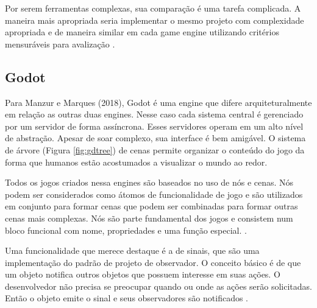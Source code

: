 Por serem ferramentas complexas, sua comparação é uma tarefa complicada. A maneira mais apropriada seria implementar o mesmo projeto com complexidade apropriada e de maneira similar em cada game engine utilizando critérios mensuráveis para avalização \cite{vsmid2017comparison}.  

\subsection{Godot}
\label{sec:godot}

Para Manzur e Marques (2018), Godot é uma engine que difere arquiteturalmente em relação as outras duas engines. Nesse caso cada sistema central é gerenciado por um servidor de forma assíncrona. Esses servidores operam em um alto nível de abstração. Apesar de soar complexo, sua interface é bem amigável. O sistema de árvore (Figura \ref{fig:gdtree}) de cenas permite organizar o conteúdo do jogo da forma que humanos estão acostumados a visualizar o mundo ao redor.

\begin{figure}[h!]
	\centering
\end{figure}
\nocite{gdtree}

Todos os jogos criados nessa engines são baseados no uso de nós e cenas. Nós podem ser considerados como átomos de funcionalidade de jogo e são utilizados em conjunto para formar cenas que podem ser combinadas para formar outras cenas mais complexas. Nós são parte fundamental dos jogos e consistem num bloco funcional com nome, propriedades e uma função especial. \cite{godotEngine}.

Uma funcionalidade que merece destaque é a de sinais, que são uma implementação do padrão de projeto de observador. O conceito básico é de que um objeto notifica outros objetos que possuem interesse em suas ações. O desenvolvedor não precisa se preocupar quando ou onde as ações serão solicitadas. Então o objeto emite o sinal e seus observadores são notificados \cite{godotEngine}.


